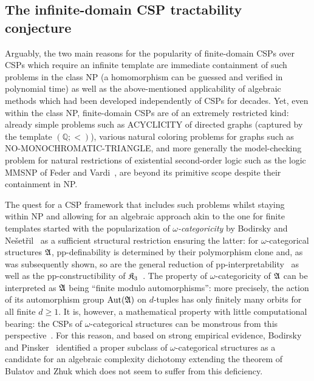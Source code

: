 \subsection{The infinite-domain CSP tractability conjecture}\label{subsection:intro_conjecture}
 
Arguably, the two main reasons for the popularity  of finite-domain CSPs over CSPs which require an infinite template are immediate containment of such problems in the class NP (a homomorphism can be guessed and verified in polynomial time) as well as the above-mentioned applicability of algebraic methods  which   had been developed independently of CSPs for decades. Yet, even within the class NP, finite-domain CSPs are of an extremely restricted kind: already simple problems such as ACYCLICITY of directed graphs (captured by the template $(\mathbb Q;<)$),  various natural coloring problems for graphs such as NO-MONOCHROMATIC-TRIANGLE, and more generally the model-checking problem for  natural restrictions of existential second-order logic such as the logic MMSNP of Feder and Vardi~\cite{federvardi1998}, are beyond its primitive scope despite their containment in NP. 

The quest for a CSP framework that includes  such problems whilst  staying within NP and allowing for an algebraic approach akin to the one for finite templates  started with the popularization of \emph{$\omega$-categoricity} by Bodirsky and Ne\v{s}et\v{r}il~\cite{bodirsky2006constraint} as a sufficient structural restriction ensuring the latter:
%
for $\omega$-categorical structures $\mathfrak{A}$, pp-definability is determined by their polymorphism clone and, as was subsequently shown, so are the general reduction of pp-interpretability~\cite{Topo-Birk} as well as the pp-constructibility of $\mathfrak{K}_3$~\cite{barto2018wonderland}.
%
The property of $\omega$-categoricity of $\mathfrak{A}$ can be interpreted as $\mathfrak{A}$ being ``finite modulo automorphisms'':
%
more precisely, the  action of its  automorphism group $\mathrm{Aut}(\mathfrak{A})$ on $d$-tuples has only finitely many orbits for all finite $d\geq 1$.
%
It is, however, a mathematical property with little computational bearing: the CSPs of $\omega$-categorical structures can be monstrous from this perspective~\cite{GJKMP-conf,gillibert2022symmetries}.
%
For this reason, and based on strong empirical evidence, Bodirsky and Pinsker~\cite{bodirsky2021projective} identified  a proper subclass of $\omega$-categorical structures as a candidate for an algebraic complexity dichotomy extending the theorem of Bulatov and Zhuk which does not seem to suffer from this deficiency.
%

